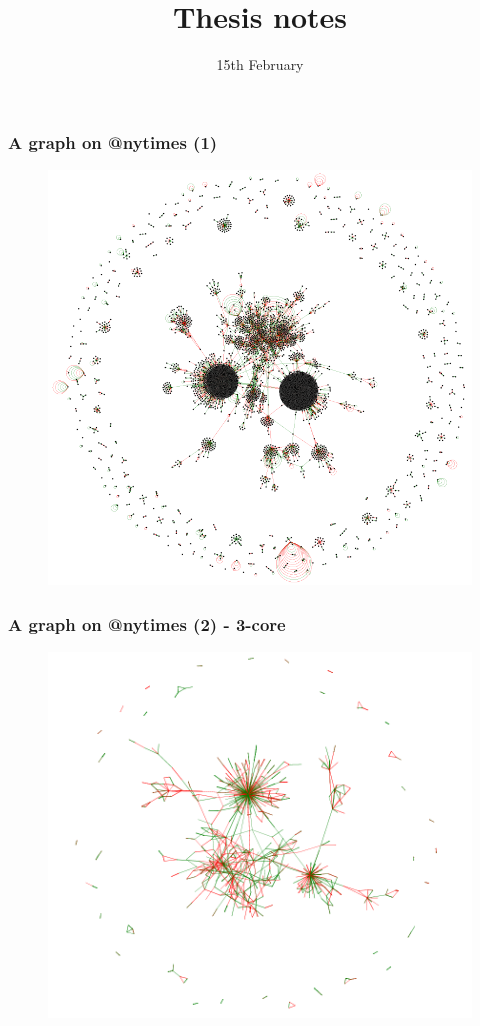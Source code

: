 \documentclass{beamer}
\begin{document}
\title{Thesis notes}
\date{15th February}
\frame{\titlepage}

\begin{frame}[c]
    \frametitle{A graph on @nytimes (1)}
    \begin{figure}[htpb]
        \centering
        \includegraphics[width=0.8\linewidth]{img/nytimes_20.png}
        \label{fig:img/nytimes_20}
    \end{figure}
\end{frame}

\begin{frame}[c]
    \frametitle{A graph on @nytimes (2) - 3-core}
    
    \begin{figure}[htpb]
        \centering
        \includegraphics[width=0.8\linewidth]{img/nytimes_20_3.png}
        \label{fig:img/nytimes_20_3}
    \end{figure}
\end{frame}
\end{document}
